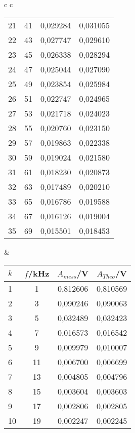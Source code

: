 \begin{center}
\begin{tabular}{c c}
\begin{tabular}{l | c | c c}
            21 &      41 &  0,029284 &  0,031055 \\
            22 &      43 &  0,027747 &  0,029610 \\
            23 &      45 &  0,026338 &  0,028294 \\
            24 &      47 &  0,025044 &  0,027090 \\
            25 &      49 &  0,023854 &  0,025984 \\
            26 &      51 &  0,022747 &  0,024965 \\
            27 &      53 &  0,021718 &  0,024023 \\
            28 &      55 &  0,020760 &  0,023150 \\
            29 &      57 &  0,019863 &  0,022338 \\
            30 &      59 &  0,019024 &  0,021580 \\
            31 &      61 &  0,018230 &  0,020873 \\
            32 &      63 &  0,017489 &  0,020210 \\
            33 &      65 &  0,016786 &  0,019588 \\
            34 &      67 &  0,016126 &  0,019004 \\
            35 &      69 &  0,015501 &  0,018453 \\
        \end{tabular} \hspace{0,5cm} &
        \begin{tabular}{l | c | c c}
            $k$ & $f$/kHz &  $A_{mess}$/V & $A_{Theo}$/V \\
            \hline
            1  &       1 &  0,812606 &  0,810569 \\
            2  &       3 &  0,090246 &  0,090063 \\
            3  &       5 &  0,032489 &  0,032423 \\
            4  &       7 &  0,016573 &  0,016542 \\
            5  &       9 &  0,009979 &  0,010007 \\
            6  &      11 &  0,006700 &  0,006699 \\
            7  &      13 &  0,004805 &  0,004796 \\
            8  &      15 &  0,003604 &  0,003603 \\
            9  &      17 &  0,002806 &  0,002805 \\
            10 &      19 &  0,002247 &  0,002245 \\

\end{tabular}
\end{tabular}
\end{center}
